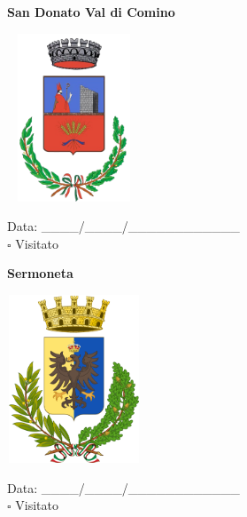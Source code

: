 \documentclass[a5paper,12pt]{article}
\begin{document}
\newpage

\noindent
\begin{minipage}[t]{0.45\textwidth}
    \begin{center}
        \textbf{San Donato Val di Comino}
    \end{center}
    \vspace{-0.5cm} %
    \begin{center}
        \includegraphics[height= 5cm, width=4cm]{Lazio/Stemma San Donato Val di Comino.png}
    \end{center}
    \vspace{-0.4cm} %
    \begin{flushleft}
        Data: \_\_\_\_/\_\_\_\_/\_\_\_\_\_\_\_\_\_\_\_\_ \\
        $\square$ Visitato
    \end{flushleft}
\end{minipage}
\hfill
\noindent
\begin{minipage}[t]{0.45\textwidth}
    \begin{center}
        \textbf{Sermoneta}
    \end{center}
    \vspace{-0.5cm} %
    \begin{center}
        \includegraphics[height= 5cm, width=4cm]{Lazio/Stemma Sermoneta.png}
    \end{center}
    \vspace{-0.4cm} %
    \begin{flushleft}
        Data: \_\_\_\_/\_\_\_\_/\_\_\_\_\_\_\_\_\_\_\_\_ \\
        $\square$ Visitato
    \end{flushleft}
\end{minipage}
\end{document}
